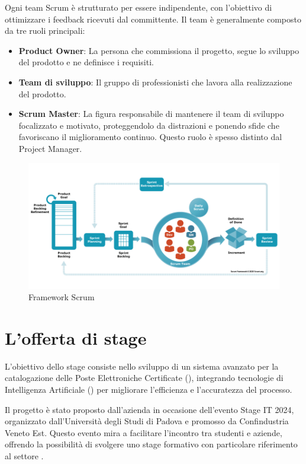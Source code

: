 Ogni team Scrum è strutturato per essere indipendente, con l'obiettivo di ottimizzare i feedback ricevuti dal committente. Il team è generalmente composto da tre ruoli principali:

\begin{itemize}
    \item \textbf{Product Owner}: La persona che commissiona il progetto, segue lo sviluppo del prodotto e ne definisce i requisiti.
    \item \textbf{Team di sviluppo}: Il gruppo di professionisti che lavora alla realizzazione del prodotto.
    \item \textbf{Scrum Master}: La figura responsabile di mantenere il team di sviluppo focalizzato e motivato, proteggendolo da distrazioni e ponendo sfide che favoriscano il miglioramento continuo. Questo ruolo è spesso distinto dal Project Manager.
\end{itemize}

\begin{figure}[h!]
    \centering
    \includegraphics[width=0.9\columnwidth]{img/scrum.png}
    \caption{Framework Scrum}
    \label{fig:scrum}
\end{figure}

\section{L'offerta di stage}
L'obiettivo dello stage consiste nello sviluppo di un sistema avanzato per la catalogazione delle Poste Elettroniche Certificate (), integrando tecnologie di Intelligenza Artificiale () per migliorare l'efficienza e l'accuratezza del processo.

Il progetto è stato proposto dall'azienda in occasione dell'evento Stage IT 2024, organizzato dall'Università degli Studi di Padova e promosso da Confindustria Veneto Est. Questo evento mira a facilitare l'incontro tra studenti e aziende, offrendo la possibilità di svolgere uno stage formativo con particolare riferimento al settore .

